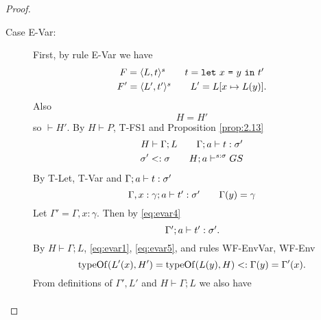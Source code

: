 \begin{proof}
\begin{description}
\begin{description}
\begin{description}
            \item[Case {\sc E-Var}:] First, by rule {\sc E-Var} we have
              \begin{equation} 
                \begin{gathered}
                  F = \mbox{$\langle L, t \rangle^s$} \quad\quad t = \mbox{\mdseries\texttt{let}~$x$~\texttt{=}~$y$~\texttt{in}~$t'$} \\ 
                  F' = \mbox{$\langle L', t' \rangle^s$} \quad\quad L' = L[x \mapsto L(y)].
                \end{gathered}
              \end{equation}
              Also
              \begin{equation} \label{eq:evar1}
                H = H'
              \end{equation}
              so $\vdash H'$.
              By $H \vdash P$, {\sc T-FS1} and Proposition \ref{prop:2.13}
              \begin{equation} \label{eq:evar3}
                \begin{gathered}
                  H \vdash \Gamma; L \quad\quad \mbox{$\Gamma;a\vdash t:\sigma'$} \\
                  \sigma' <: \sigma \quad\quad H; a \vdash^{s: \sigma} GS
                \end{gathered}
              \end{equation}
              By {\sc T-Let, T-Var} and $\mbox{$\Gamma;a\vdash t:\sigma'$}$
              \begin{equation} \label{eq:evar4}
                \mbox{$\Gamma, x: \gamma;a\vdash t':\sigma'$} \quad\quad \Gamma(y) =
                \gamma
              \end{equation}
              Let $\Gamma' = \Gamma, x: \gamma$.
              Then by \eqref{eq:evar4}
              \begin{equation} \label{eq:evar5}
                \mbox{$\Gamma';a\vdash t':\sigma'$}.
              \end{equation}
              By $H \vdash \Gamma; L$, \eqref{eq:evar1}, \eqref{eq:evar5}, and
              rules {\sc WF-EnvVar}, {\sc WF-Env}
              \begin{equation} \label{eq:evar8}
                \mbox{$\mathrm{typeOf}$}(L'(x), H') = \mbox{$\mathrm{typeOf}$}(L(y), H) <: \Gamma(y) =
                \Gamma'(x).
              \end{equation}
              From definitions of $\Gamma', L'$ and $H \vdash \Gamma;L$ we also have 
              \begin{equation} \label{eq:evar9}
                \begin{aligned}

\end{aligned}
\end{equation}
\end{description}
\end{description}
\end{description}
\end{proof}
